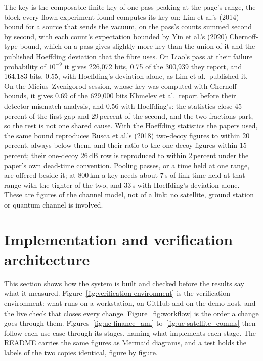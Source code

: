 \documentclass[11pt,a4paper]{article}
\begin{document}
The key is the composable finite key of one pass peaking at the page's range, the block every flown
experiment found computes its key on: Lim et al.'s (2014) bound for a source that sends the vacuum,
on the pass's counts summed second by second, with each count's expectation bounded by Yin et al.'s
(2020) Chernoff-type bound, which on a pass gives slightly more key than the union of it and the
published Hoeffding deviation that the fibre uses. On Liao's pass at
their failure probability of $10^{-9}$ it gives 226,072 bits, 0.75 of the 300,939 they report, and
164,183 bits, 0.55, with Hoeffding's deviation alone, as Lim et al.\ published it. On the
Micius--Zvenigorod session, whose key was computed with Chernoff bounds, it gives 0.69 of the 629,000
bits Khmelev et al.\ report before their detector-mismatch analysis, and
0.56 with Hoeffding's: the statistics close 45\,percent of the first gap and 29\,percent of the
second, and the two fractions part, so the rest is not one shared cause. With the Hoeffding statistics the papers used, the same
bound reproduces Rusca et al.'s (2018) two-decoy figures to within 20\,percent, always below them,
and their ratio to the one-decoy figures within 15\,percent; their one-decoy 26\,dB row is
reproduced to within 2\,percent under the paper's own dead-time convention. Pooling passes, or a
time held at one range, are offered beside it; at 800\,km a key needs about 7\,s of link time held
at that range with the tighter of the two, and 33\,s with Hoeffding's deviation alone. These are
figures of the channel model, not of a link: no satellite, ground station or quantum channel is
involved.

\section{Implementation and verification architecture}\label{sec:arch}

This section shows how the system is built and checked before the results say what it measured.
Figure~\ref{fig:verification-environment} is the verification environment: what runs on a
workstation, on GitHub and on the demo host, and the live check that closes every change.
Figure~\ref{fig:workflow} is the order a change goes through them. Figures~\ref{fig:uc-finance_aml}
to~\ref{fig:uc-satellite_comms} then follow each use case through its stages, naming what implements
each stage. The README carries the same figures as Mermaid diagrams, and a test holds the labels of
the two copies identical, figure by figure.
\end{document}
